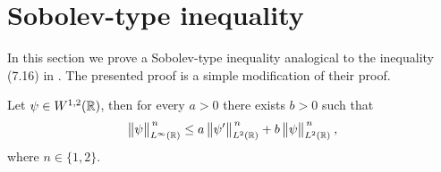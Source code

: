\section{Sobolev-type inequality}
\label{apdx-sobolev-ineq}

In this section we prove a Sobolev-type inequality analogical to the inequality (7.16) in \citet{BEH}. The presented proof is a simple modification of their proof.
\begin{lemma}
	Let $\psi \in W^{1,2}(\mathbb{R})$, then for every $a>0$ there exists $b>0$ such that
	\begin{equation}
		\big\lVert \psi \big\rVert^{\,n}_{L^\infty(\mathbb{R})}
		\leq
		a \, \big\lVert \psi' \big\rVert^{\,n}_{L^2(\mathbb{R})} +
		b \, \big\lVert \psi \big\rVert^{\,n}_{L^2(\mathbb{R})}
		\: ,
		\label{sobolev-type-0}
	\end{equation}
	where $n \in \{ 1, 2 \}$.
	\label{lemma-sobolev-type-inequality}
\end{lemma}
